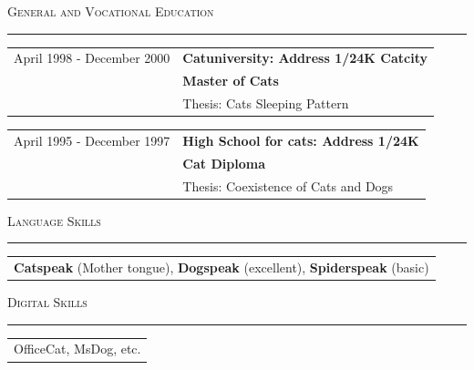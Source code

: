 \documentclass[
	fontsize = 10.0pt,
	a4paper,
	parskip = half*,
	twoside,	%
]{scrartcl}
\renewcommand{\arraystretch}{1.5}			%
\newcommand{\hlinewidth}{0.5mm}
\newcommand{\hlinelength}{150mm}
\newcommand{\hlinecolor}{black!25}
\newcommand{\hlinevskip}{-4.0mm}
\newcommand{\vskipEntries}{-5.0mm}
\newcommand{\hskipFirstColumn}{5.0cm}
\begin{document}
	{\fontsize{20pt}{17pt}\selectfont\scshape General and Vocational Education}
	\renewcommand{\arraystretch}{1.25}			%
	\vskip \hlinevskip%
	\textcolor{\hlinecolor}{\rule{\hlinelength}{\hlinewidth}}

	\begin{table}[H]
		\begin{tabular}{ p{\hskipFirstColumn} l }		%
			April 1998 - December 2000		&	{\fontsize{10pt}{10pt}\selectfont\bfseries Catuniversity: Address 1/24K Catcity}	\\
											&	\textbf{Master of Cats}									\\
											&	Thesis: Cats Sleeping Pattern							\\
		\end{tabular}
	\end{table}%

	\vspace{\vskipEntries}

	\begin{table}[H]
		\begin{tabular}{ p{\hskipFirstColumn} l }		%
			April 1995 - December 1997		&	{\fontsize{10pt}{10pt}\selectfont\bfseries High School for cats: Address 1/24K}	\\
											&	\textbf{Cat Diploma}									\\
											&	Thesis: Coexistence of Cats and Dogs							\\
		\end{tabular}
	\end{table}%

	{\fontsize{20pt}{17pt}\selectfont\scshape Language Skills}
	\vskip \hlinevskip%
	\textcolor{\hlinecolor}{\rule{\hlinelength}{\hlinewidth}}

	\renewcommand{\arraystretch}{1.35}			%
	\begin{table}[H]
		\begin{tabular}{ l }
			\textbf{Catspeak} (Mother tongue), \textbf{Dogspeak} (excellent), \textbf{Spiderspeak} (basic)\\
		\end{tabular}
	\end{table}%

	{\fontsize{20pt}{17pt}\selectfont\scshape Digital Skills}
	\vskip \hlinevskip%
	\textcolor{\hlinecolor}{\rule{\hlinelength}{\hlinewidth}}

	\begin{table}[H]
		\begin{tabular}{ l}
			OfficeCat, MsDog, etc.
		\end{tabular}
	\end{table}%
\end{document}
